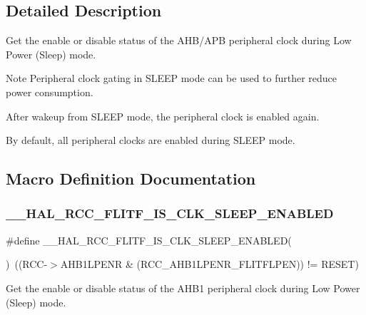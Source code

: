 \subsection{Detailed Description}
Get the enable or disable status of the A\+H\+B/\+A\+PB peripheral clock during Low Power (Sleep) mode. 

\begin{DoxyNote}{Note}
Peripheral clock gating in S\+L\+E\+EP mode can be used to further reduce power consumption. 

After wakeup from S\+L\+E\+EP mode, the peripheral clock is enabled again. 

By default, all peripheral clocks are enabled during S\+L\+E\+EP mode. 
\end{DoxyNote}


\subsection{Macro Definition Documentation}
\mbox{\label{group___r_c_c___clock___sleep___enable___disable___status_ga968fb378568454a2913e11a238131ae4}} 
\subsubsection{\texorpdfstring{\_\_HAL\_RCC\_FLITF\_IS\_CLK\_SLEEP\_ENABLED}{\_\_HAL\_RCC\_FLITF\_IS\_CLK\_SLEEP\_ENABLED}}
{\footnotesize\ttfamily \#define \+\_\+\+\_\+\+H\+A\+L\+\_\+\+R\+C\+C\+\_\+\+F\+L\+I\+T\+F\+\_\+\+I\+S\+\_\+\+C\+L\+K\+\_\+\+S\+L\+E\+E\+P\+\_\+\+E\+N\+A\+B\+L\+ED(\begin{DoxyParamCaption}{ }\end{DoxyParamCaption})~((R\+CC-\/$>$A\+H\+B1\+L\+P\+E\+NR \& (R\+C\+C\+\_\+\+A\+H\+B1\+L\+P\+E\+N\+R\+\_\+\+F\+L\+I\+T\+F\+L\+P\+EN)) != R\+E\+S\+ET)}



Get the enable or disable status of the A\+H\+B1 peripheral clock during Low Power (Sleep) mode. 

